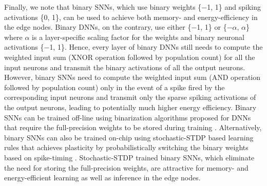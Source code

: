 Finally, we note that binary SNNs, which use binary weights \{$-$1, 1\} and spiking activations \{0, 1\}, can be used to achieve both memory- and energy-efficiency in the edge nodes. Binary DNNs, on the contrary, use either \{$-$1, 1\} \cite{courbariaux2015binaryconnect} or \{$-\alpha$, $\alpha$\} \cite{rastegari2016xnor} where $\alpha$ is a layer-specific scaling factor for the weights and binary neuronal activations \{$-$1, 1\}. Hence, every layer of binary DNNs still needs to compute the weighted input sum (XNOR operation followed by population count) for all the input neurons and transmit the binary activations of all the output neurons. However, binary SNNs need to compute the weighted input sum (AND operation followed by population count) only in the event of a spike fired by the corresponding input neurons and transmit only the sparse spiking activations of the output neurons, leading to potentially much higher energy efficiency. Binary SNNs can be trained off-line using binarization algorithms proposed for DNNs that require the full-precision weights to be stored during training \cite{courbariaux2015binaryconnect, rastegari2016xnor, hubara2017quantized}. Alternatively, binary SNNs can also be trained on-chip using stochastic-STDP based learning rules that achieves plasticity by probabilistically switching the binary weights based on spike-timing \cite{suri2013bio, querlioz2015bioinspired, srinivasan2016magnetic, srinivasan2019restocnet}. Stochastic-STDP trained binary SNNs, which eliminate the need for storing the full-precision weights, are attractive for memory- and energy-efficient learning as well as inference in the edge nodes.